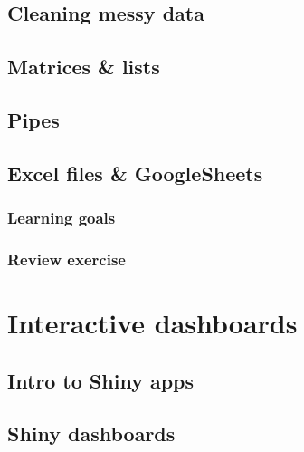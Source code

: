 \documentclass[
]{book}
\begin{document}
\hypertarget{cleaning-messy-data}{%
\chapter{Cleaning messy data}\label{cleaning-messy-data}}

\hypertarget{matrices-lists}{%
\chapter{Matrices \& lists}\label{matrices-lists}}

\hypertarget{pipes}{%
\chapter{Pipes}\label{pipes}}

\hypertarget{excel-files-googlesheets}{%
\chapter{Excel files \& GoogleSheets}\label{excel-files-googlesheets}}

\hypertarget{learning-goals-17}{%
\section*{Learning goals}\label{learning-goals-17}}

\hypertarget{review-exercise-5}{%
\section*{Review exercise}\label{review-exercise-5}}

\hypertarget{part-interactive-dashboards}{%
\part{Interactive dashboards}\label{part-interactive-dashboards}}

\hypertarget{intro-to-shiny-apps}{%
\chapter{Intro to Shiny apps}\label{intro-to-shiny-apps}}

\hypertarget{shiny-dashboards}{%
\chapter{Shiny dashboards}\label{shiny-dashboards}}
\end{document}
